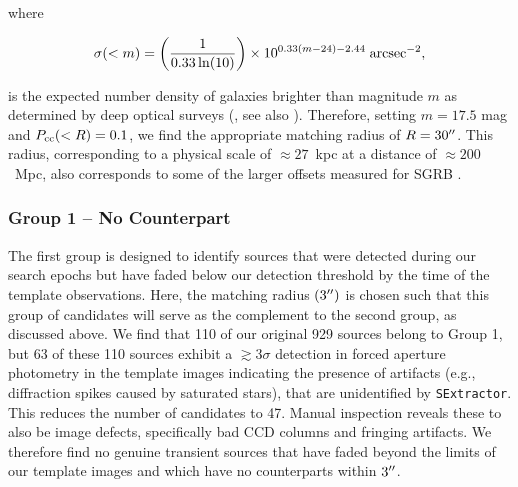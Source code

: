 \noindent where

\begin{equation}
\sigma(<m) = \left ( \frac{1}{0.33 \ln(10)} \right ) \times 10^{0.33(m - 24) - 2.44} \; {\rm arcsec}^{-2},
\end{equation}

\noindent is the expected number density of galaxies brighter than magnitude $m$ as determined by deep optical surveys (\citealt{Berger2010}, see also \citealt{Hogg+97,Bloom+02,Beckwith+06}). Therefore, setting $m = 17.5$ mag and $P_{\rm cc}(<R) = 0.1$, we find the appropriate matching radius of $R = 30\hbox{$^{\prime\prime}$}$. This radius, corresponding to a physical scale of $\approx 27$~kpc at a distance of $\approx200$~Mpc, also corresponds to some of the larger offsets measured for SGRB \citep{Fong+10,FongBerger13,Berger2014}.

\subsubsection{Group 1 -- No Counterpart}
\label{sec:ch3_group1}

The first group is designed to identify sources that were detected during our search epochs but have faded below our detection threshold by the time of the template observations. Here, the matching radius $(3 \hbox{$^{\prime\prime}$})$ is chosen such that this group of candidates will serve as the complement to the second group, as discussed above. We find that 110 of our original 929 sources belong to Group 1, but 63 of these 110 sources exhibit a $\gtrsim 3 \sigma$ detection in forced aperture photometry in the template images indicating the presence of artifacts (e.g., diffraction spikes caused by saturated stars), that are unidentified by {\tt SExtractor}. This reduces the number of candidates to 47. Manual inspection reveals these to also be image defects, specifically bad CCD columns and fringing artifacts. We therefore find no genuine transient sources that have faded beyond the limits of our template images and which have no counterparts within $3\hbox{$^{\prime\prime}$}$.

